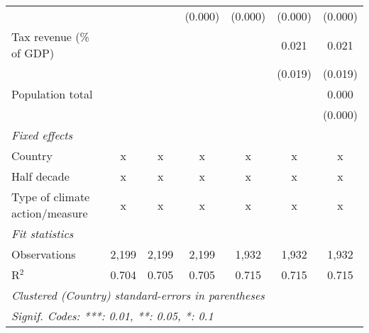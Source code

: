 \begin{tabular}{lcccccc}
                                                                                    &               &              & (0.000)      & (0.000)      & (0.000)      & (0.000)\\   
   Tax revenue (\% of GDP)                                                          &               &              &              &              & 0.021        & 0.021\\   
                                                                                    &               &              &              &              & (0.019)      & (0.019)\\   
   Population total                                                                 &               &              &              &              &              & 0.000\\   
                                                                                    &               &              &              &              &              & (0.000)\\   
   \emph{Fixed effects}\\
   Country                                                                          & x             & x            & x            & x            & x            & x\\  
   Half decade                                                                      & x             & x            & x            & x            & x            & x\\  
   Type of climate action/measure                                                   & x             & x            & x            & x            & x            & x\\  
   \midrule \emph{Fit statistics}\\
   Observations                                                                     & 2,199         & 2,199        & 2,199        & 1,932        & 1,932        & 1,932\\  
   R$^2$                                                                            & 0.704         & 0.705        & 0.705        & 0.715        & 0.715        & 0.715\\  
   \midrule
   \multicolumn{7}{l}{\emph{Clustered (Country) standard-errors in parentheses}}\\
   \multicolumn{7}{l}{\emph{Signif. Codes: ***: 0.01, **: 0.05, *: 0.1}}\\
\end{tabular}
\par\endgroup


